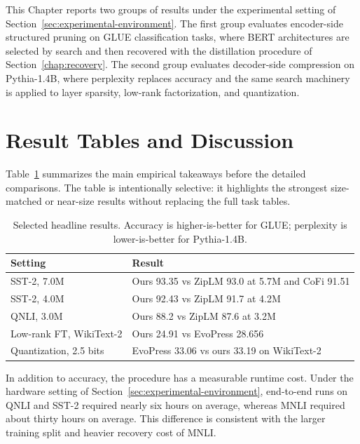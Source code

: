 This Chapter reports two groups of results under the experimental setting of Section~\ref{sec:experimental-environment}. The first group evaluates encoder-side structured pruning on GLUE classification tasks, where BERT architectures are selected by search and then recovered with the distillation procedure of Section~\ref{chap:recovery}. The second group evaluates decoder-side compression on Pythia-1.4B, where perplexity replaces accuracy and the same search machinery is applied to layer sparsity, low-rank factorization, and quantization.

\section{Result Tables and Discussion}
\label{chap:results}



Table~\ref{tab:key_results} summarizes the main empirical takeaways before the detailed comparisons. The table is intentionally selective: it highlights the strongest size-matched or near-size results without replacing the full task tables.

\begin{table}[H]
\centering
\scriptsize
\setlength{\tabcolsep}{4pt}
\renewcommand{\arraystretch}{1.08}
\caption{Selected headline results. Accuracy is higher-is-better for GLUE; perplexity is lower-is-better for Pythia-1.4B.}
\label{tab:key_results}
\begin{tabularx}{\textwidth}{@{}p{}X@{}}
\toprule
Setting & Result \\
\midrule
SST-2, 7.0M & Ours 93.35 vs ZipLM 93.0 at 5.7M and CoFi 91.51 \\
SST-2, 4.0M & Ours 92.43 vs ZipLM 91.7 at 4.2M \\
QNLI, 3.0M & Ours 88.2 vs ZipLM 87.6 at 3.2M \\
Low-rank FT, WikiText-2 & Ours 24.91 vs EvoPress 28.656 \\
Quantization, 2.5 bits & EvoPress 33.06 vs ours 33.19 on WikiText-2 \\
\bottomrule
\end{tabularx}
\end{table}

In addition to accuracy, the procedure has a measurable runtime cost. Under the hardware setting of Section~\ref{sec:experimental-environment}, end-to-end runs on QNLI and SST-2 required nearly six hours on average, whereas MNLI required about thirty hours on average. This difference is consistent with the larger training split and heavier recovery cost of MNLI.

